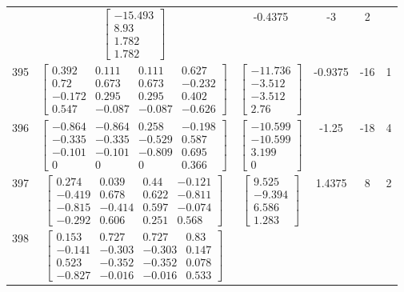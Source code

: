\documentclass[a4paper,12pt]{article}
\begin{document}
\begin{tabular}{c c c c c c}
&
$\begin{bmatrix} -15.493 \\ 8.93 \\ 1.782 \\ 1.782 \end{bmatrix}$
&
-0.4375
&
-3
&
2
\\
395
&
$\begin{bmatrix} 0.392 & 0.111 & 0.111 & 0.627 \\ 0.72 & 0.673 & 0.673 & -0.232 \\ -0.172 & 0.295 & 0.295 & 0.402 \\ 0.547 & -0.087 & -0.087 & -0.626 \end{bmatrix}$
&
$\begin{bmatrix} -11.736 \\ -3.512 \\ -3.512 \\ 2.76 \end{bmatrix}$
&
-0.9375
&
-16
&
1
\\
396
&
$\begin{bmatrix} -0.864 & -0.864 & 0.258 & -0.198 \\ -0.335 & -0.335 & -0.529 & 0.587 \\ -0.101 & -0.101 & -0.809 & 0.695 \\ 0 & 0 & 0 & 0.366 \end{bmatrix}$
&
$\begin{bmatrix} -10.599 \\ -10.599 \\ 3.199 \\ 0 \end{bmatrix}$
&
-1.25
&
-18
&
4
\\
397
&
$\begin{bmatrix} 0.274 & 0.039 & 0.44 & -0.121 \\ -0.419 & 0.678 & 0.622 & -0.811 \\ -0.815 & -0.414 & 0.597 & -0.074 \\ -0.292 & 0.606 & 0.251 & 0.568 \end{bmatrix}$
&
$\begin{bmatrix} 9.525 \\ -9.394 \\ 6.586 \\ 1.283 \end{bmatrix}$
&
1.4375
&
8
&
2
\\
398
&
$\begin{bmatrix} 0.153 & 0.727 & 0.727 & 0.83 \\ -0.141 & -0.303 & -0.303 & 0.147 \\ 0.523 & -0.352 & -0.352 & 0.078 \\ -0.827 & -0.016 & -0.016 & 0.533 \end{bmatrix}$

\end{tabular}
\end{document}
